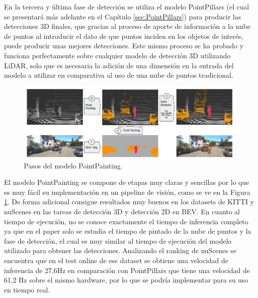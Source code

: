 En la tercera y última fase de detección se utiliza el modelo PointPillars \cite{PointPillars} (el cual se presentará más adelante en el Capítulo \ref{sec:PointPillars}) para producir las detecciones 3D finales, que gracias al proceso de aporte de información a la nube de puntos al introducir el dato de que puntos inciden en los objetos de interés, puede producir unas mejores detecciones. Este mismo proceso se ha probado y funciona perfectamente sobre cualquier modelo de detección 3D utilizando \ac{LiDAR}, solo que es necesaria la adición de una dimensión en la entrada del modelo a utilizar en comparativa al uso de una nube de puntos tradicional.

\begin{figure}[H]
    \centering
    \includegraphics[width=1\textwidth]{Book/figures/2_estado_arte/painted_pointpillars.png}
    \caption{Pasos del modelo PointPainting.}
    \label{fig:Pasos del modelo PointPainting.}
\end{figure}

El modelo PointPainting se compone de etapas muy claras y sencillas por lo que es muy fácil su implementación en un pipeline de visión, como se ve en la Figura \ref{fig:Pasos del modelo PointPainting.}. De forma adicional consigue resultados muy buenos en los datasets de KITTI y nuScenes en las tareas de detección 3D y detección 2D en \ac{BEV}. En cuanto al tiempo de ejecución, no se conoce exactamente el tiempo de inferencia completo ya que en el paper solo se estudia el tiempo de pintado de la nube de puntos y la fase de detección, el cual es muy similar al tiempo de ejecución del modelo utilizado para obtener las detecciones. Analizando el ranking de nuScenes se encuentra que en el test online de ese dataset se obtiene una velocidad de inferencia de 27,6Hz en comparación con PointPillars que tiene una velocidad de 61,2 Hz sobre el mismo hardware, por lo que se podría implementar para su uso en tiempo real.